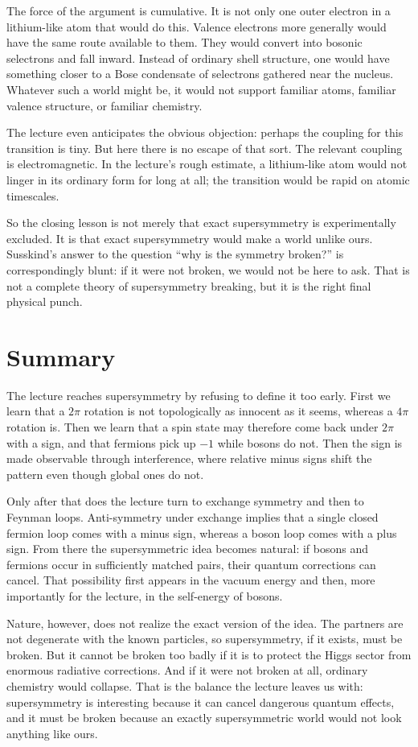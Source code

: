 The force of the argument is cumulative. It is not only one outer electron in a lithium-like atom that would do this. Valence electrons more generally would have the same route available to them. They would convert into bosonic selectrons and fall inward. Instead of ordinary shell structure, one would have something closer to a Bose condensate of selectrons gathered near the nucleus. Whatever such a world might be, it would not support familiar atoms, familiar valence structure, or familiar chemistry.

The lecture even anticipates the obvious objection: perhaps the coupling for this transition is tiny. But here there is no escape of that sort. The relevant coupling is electromagnetic. In the lecture's rough estimate, a lithium-like atom would not linger in its ordinary form for long at all; the transition would be rapid on atomic timescales.

So the closing lesson is not merely that exact supersymmetry is experimentally excluded. It is that exact supersymmetry would make a world unlike ours. Susskind's answer to the question ``why is the symmetry broken?'' is correspondingly blunt: if it were not broken, we would not be here to ask. That is not a complete theory of supersymmetry breaking, but it is the right final physical punch.

\section{Summary}

The lecture reaches supersymmetry by refusing to define it too early. First we learn that a \(2\pi\) rotation is not topologically as innocent as it seems, whereas a \(4\pi\) rotation is. Then we learn that a spin state may therefore come back under \(2\pi\) with a sign, and that fermions pick up \(-1\) while bosons do not. Then the sign is made observable through interference, where relative minus signs shift the pattern even though global ones do not.

Only after that does the lecture turn to exchange symmetry and then to Feynman loops. Anti-symmetry under exchange implies that a single closed fermion loop comes with a minus sign, whereas a boson loop comes with a plus sign. From there the supersymmetric idea becomes natural: if bosons and fermions occur in sufficiently matched pairs, their quantum corrections can cancel. That possibility first appears in the vacuum energy and then, more importantly for the lecture, in the self-energy of bosons.

Nature, however, does not realize the exact version of the idea. The partners are not degenerate with the known particles, so supersymmetry, if it exists, must be broken. But it cannot be broken too badly if it is to protect the Higgs sector from enormous radiative corrections. And if it were not broken at all, ordinary chemistry would collapse. That is the balance the lecture leaves us with: supersymmetry is interesting because it can cancel dangerous quantum effects, and it must be broken because an exactly supersymmetric world would not look anything like ours.